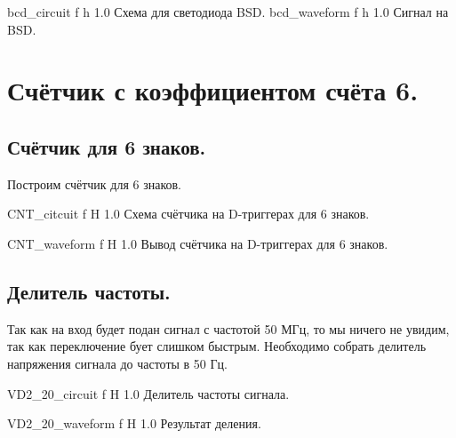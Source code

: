 \documentclass{bmstu}
\begin{document}
	{bcd_circuit}
	{f} %
	{h} %
	{1.0\textwidth} %
	{Схема для светодиода BSD.} %
	{bcd_waveform}
	{f} %
	{h} %
	{1.0\textwidth} %
	{Сигнал на BSD.} %
	
	
	\chapter{Счётчик с коэффициентом счёта 6.}
	
	\section{Счётчик для 6 знаков.}
	\begin{flushleft}
		Построим счётчик для 6 знаков.
	\end{flushleft}

	{CNT_citcuit}
	{f} %
	{H} %
	{1.0\textwidth} %
	{Схема счётчика на D-триггерах для 6 знаков.} %

	{CNT_waveform}
	{f} %
	{H} %
	{1.0\textwidth} %
	{Вывод счётчика на D-триггерах для 6 знаков.} %

	\section{Делитель частоты.}

	\begin{flushleft}
		Так как на вход будет подан сигнал с частотой 50 МГц, то мы
		ничего не увидим, так как переключение бует слишком быстрым.
		Необходимо собрать делитель напряжения сигнала до частоты в
		50 Гц.
	\end{flushleft}

	{VD2_20_circuit}
	{f} %
	{H} %
	{1.0\textwidth} %
	{Делитель частоты сигнала.} %
	
	{VD2_20_waveform}
	{f} %
	{H} %
	{1.0\textwidth} %
	{Результат деления.} %
	
\end{document}
